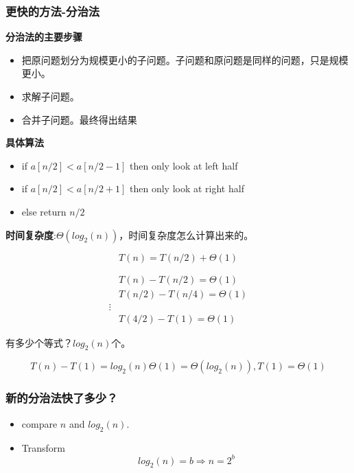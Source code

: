 \documentclass[11pt]{article}
\begin{document}
\begin{CJK}{UTF8}{gbsn}
\subsubsection{更快的方法-分治法}

\textbf{分治法的主要步骤}

\begin{itemize}
\item 把原问题划分为规模更小的子问题。子问题和原问题是同样的问题，只是规模更小。
\item 求解子问题。
\item 合并子问题。最终得出结果
\end{itemize}

\textbf{具体算法}

\begin{itemize}
\item if $a[n / 2]<a[n / 2-1]$ then only look at left half
\item if $a[n / 2]<a[n / 2+1]$ then only look at right half
\item else return $n/2$
\end{itemize}

\textbf{时间复杂度}:$\Theta(log_2(n))$，时间复杂度怎么计算出来的。

\begin{displaymath}
  T(n)=T(n/2)+\Theta(1)
\end{displaymath}

\begin{displaymath}
  \left.
    \begin{aligned}
      &T(n)-T(n/2)=\Theta(1)\\
      &T(n/2)-T(n/4)=\Theta(1)\\
      \vdots \\
      &T(4/2)-T(1) = \Theta(1)
    \end{aligned}
  \right.
\end{displaymath}

有多少个等式？$log_2(n)$个。

\begin{displaymath}
  T(n)-T(1)=log_2(n)\Theta(1)=\Theta(log_2(n)), T(1)=\Theta(1)
\end{displaymath}

\subsubsection{新的分治法快了多少？}

\begin{itemize}
\item compare $n$ and $log_2(n)$.
\item Transform
  \begin{displaymath}
    log_2(n)=b \Rightarrow n=2^b
  \end{displaymath}


\end{itemize}
\end{CJK}
\end{document}
